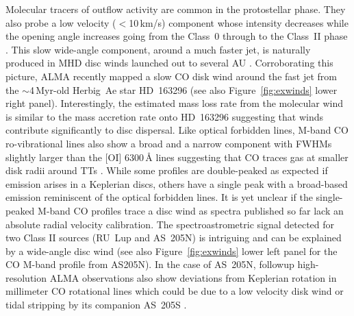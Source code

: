 \documentclass{rsos}
\begin{document}
Molecular tracers of outflow activity are common in the protostellar phase. They also probe a low velocity ($<$10\,km/s) component whose intensity decreases while the opening angle increases going from the Class~0 through to the Class~II phase 
\cite{2014prpl.conf..451F}.
This slow wide-angle component, around a much faster jet, is naturally produced in MHD disc winds launched out to several AU 
\cite{2007prpl.conf..277P,2012A&A...538A...2P}. Corroborating this picture, ALMA 
recently mapped a slow CO disk wind around the fast jet from the $\sim$4\,Myr-old Herbig~Ae star HD~163296 \cite{2013A&A...555A..73K} (see also Figure~\ref{fig:exwinds} lower right panel).
 Interestingly, the estimated mass loss rate from the molecular wind is similar to the mass accretion rate onto HD~163296 suggesting that winds contribute significantly to disc dispersal. Like optical forbidden lines, M-band CO ro-vibrational lines also show a broad and a narrow component 
 \cite{2015ApJ...809..167B} with FWHMs slightly  larger than the [OI] 6300\,\AA{} lines suggesting that CO traces gas at smaller disk radii around TTs \cite{2016ApJ...831..169S}. While some profiles are double-peaked as expected if emission arises in a Keplerian discs, others have a single peak with a broad-based emission 
 \cite{2011A&A...527A.119B} reminiscent of the optical forbidden lines. It is yet unclear if the single-peaked M-band CO profiles trace a disc wind as  spectra published so far lack an absolute radial velocity calibration. The spectroastrometric signal detected for two Class II sources (RU~Lup and AS~205N) is intriguing and can be explained by a wide-angle disc wind 
\cite{2011ApJ...733...84P} (see also  Figure~\ref{fig:exwinds} lower left panel for the CO M-band profile from AS205N). In the case of AS~205N, followup high-resolution ALMA observations also show deviations from Keplerian rotation in millimeter CO rotational lines which could be due to a low velocity disk wind or tidal stripping by its companion AS~205S \cite{2014ApJ...792...68S}.


\end{document}
